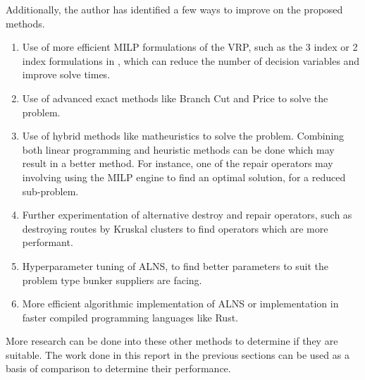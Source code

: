 Additionally, the author has identified a few ways to improve on the proposed methods.
\begin{enumerate}
\item Use of more efficient MILP formulations of the VRP, such as the 3 index or 2 index formulations in \citep{cattaruzza_vehicle_2018}, which can reduce the number of decision variables and improve solve times.
\item Use of advanced exact methods like Branch Cut and Price to solve the problem.
\item Use of hybrid methods like matheuristics to solve the problem. Combining both linear programming and heuristic methods can be done which may result in a better method. For instance, one of the repair operators may involving using the MILP engine to find an optimal solution, for a reduced sub-problem.
\item Further experimentation of alternative destroy and repair operators, such as destroying routes by Kruskal clusters to find operators which are more performant.
\item Hyperparameter tuning of ALNS, to find better parameters to suit the problem type bunker suppliers are facing.
\item More efficient algorithmic implementation of ALNS or implementation in faster compiled programming languages like Rust.
\end{enumerate}

More research can be done into these other methods to determine if they are suitable. The work done in this report in the previous sections can be used as a basis of comparison to determine their performance.